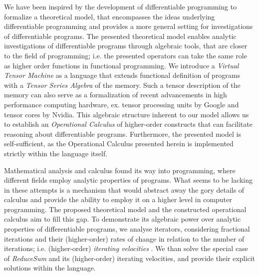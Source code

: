 We have been inspired by the development of differentiable programming to formalize a theoretical model, that encompasses the ideas underlying differentiable programming and provides a more general setting for investigations of differentiable programs. The presented theoretical model enables analytic investigations of differentiable programs through algebraic tools, that are closer to the field of programming; i.e. the presented operators can take the same role as higher order functions in functional programming. We introduce a \emph{Virtual Tensor Machine} as a language that extends functional definition of programs with a \emph{Tensor Series Algebra} of the memory. Such a tensor description of the memory can also serve as a formalization of recent advancements in high performance computing hardware, ex. tensor processing units by Google and tensor cores by Nvidia. This algebraic structure inherent to our model allows us to establish an \emph{Operational Calculus} of higher-order constructs that can facilitate reasoning about differentiable programs. Furthermore, the presented model is self-sufficient, as the Operational Calculus presented herein is implemented strictly within the language itself.

Mathematical analysis and calculus found its way into programming, where different fields employ analytic properties of programs. What seems to be lacking in these attempts is a mechanism that would abstract away the gory details of calculus and provide the ability to employ it on a higher level in computer programming. The proposed theoretical model and the constructed operational calculus aim to fill this gap. To demonstrate its algebraic power over analytic properties of differentiable programs, we analyse iterators, considering fractional iterations and their (higher-order) rates of change in relation to the number of iterations; i.e. (higher-order) \emph{ iterating velocities }. We than solve the special case of \emph{ReduceSum} and its (higher-order) iterating velocities, and provide their explicit solutions within the language.

